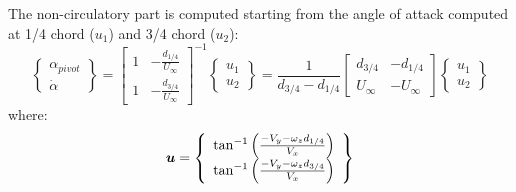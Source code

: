 The non-circulatory part is computed starting from the angle of attack
computed at 1/4 chord ($u_1$) and 3/4 chord ($u_2$):
\begin{equation}
\left\{
	\begin{array}{c}
		\alpha_{pivot} \\
		\dot{\alpha}
	\end{array}
\right\} = 
\left[
	\begin{array}{cc}
		1 & -\frac{d_{1/4}}{U_\infty}\\
		1 & -\frac{d_{3/4}}{U_\infty}
	\end{array}
\right]^{-1} 
\left\{
	\begin{array}{c}
		u_1 \\
		u_2
	\end{array}
\right\} = \frac{1}{d_{3/4}-d_{1/4}} 
\left[
	\begin{array}{cc}
		d_{3/4} & -d_{1/4}\\
		U_\infty & -U_\infty
	\end{array}
\right]
\left\{
	\begin{array}{c}
		u_1 \\
		u_2
	\end{array}
\right\}
\end{equation}
where:
\begin{equation}
	\bm{u} = \left\{ \begin{array}{c} 
		\tan^{-1} \left(  \frac{-V_y - \omega_z d_{1/4}}{V_x} \right)\\
		\tan^{-1} \left(  \frac{-V_y - \omega_z d_{3/4}}{V_x} \right)\\
	 \end{array} \right\}
\end{equation}


